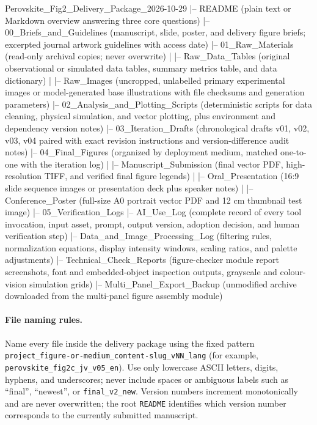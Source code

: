 \begin{Prompt}
 Perovskite_Fig2_Delivery_Package_2026-10-29
  |-- README (plain text or Markdown overview answering three core questions)
  |-- 00_Briefs_and_Guidelines (manuscript, slide, poster, and delivery figure briefs; excerpted journal artwork guidelines with access date)
  |-- 01_Raw_Materials (read-only archival copies; never overwrite)
  |     |-- Raw_Data_Tables (original observational or simulated data tables, summary metrics table, and data dictionary)
  |     |-- Raw_Images (uncropped, unlabelled primary experimental images or model-generated base illustrations with file checksums and generation parameters)
  |-- 02_Analysis_and_Plotting_Scripts (deterministic scripts for data cleaning, physical simulation, and vector plotting, plus environment and dependency version notes)
  |-- 03_Iteration_Drafts (chronological drafts v01, v02, v03, v04 paired with exact revision instructions and version-difference audit notes)
  |-- 04_Final_Figures (organized by deployment medium, matched one-to-one with the iteration log)
  |     |-- Manuscript_Submission (final vector PDF, high-resolution TIFF, and verified final figure legends)
  |     |-- Oral_Presentation (16:9 slide sequence images or presentation deck plus speaker notes)
  |     |-- Conference_Poster (full-size A0 portrait vector PDF and 12 cm thumbnail test image)
  |-- 05_Verification_Logs
        |-- AI_Use_Log (complete record of every tool invocation, input asset, prompt, output version, adoption decision, and human verification step)
        |-- Data_and_Image_Processing_Log (filtering rules, normalization equations, display intensity windows, scaling ratios, and palette adjustments)
        |-- Technical_Check_Reports (figure-checker module report screenshots, font and embedded-object inspection outputs, grayscale and colour-vision simulation grids)
        |-- Multi_Panel_Export_Backup (unmodified archive downloaded from the multi-panel figure assembly module)
\end{Prompt}

\paragraph{File naming rules.}
Name every file inside the delivery package using the fixed pattern \texttt{project\_figure-or-medium\_content-slug\_vNN\_lang} (for example, \texttt{perovskite\_fig2c\_jv\_v05\_en}). Use only lowercase ASCII letters, digits, hyphens, and underscores; never include spaces or ambiguous labels such as ``final'', ``newest'', or \texttt{final\_v2\_new}. Version numbers increment monotonically and are never overwritten; the root \texttt{README} identifies which version number corresponds to the currently submitted manuscript.

